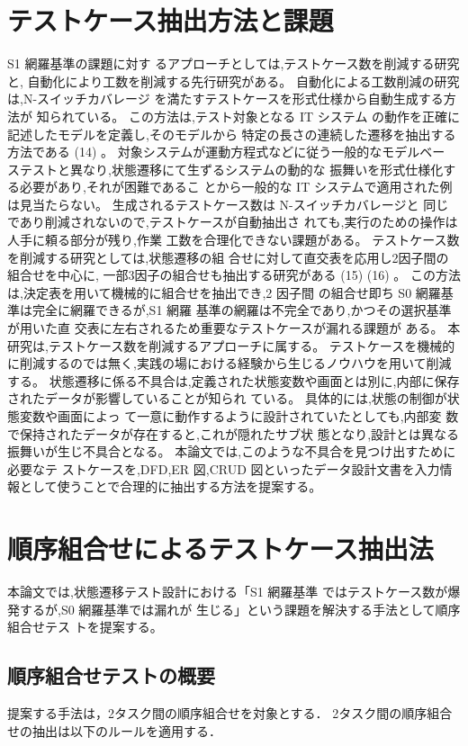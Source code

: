 \documentclass[a4paper,12pt]{jreport}
\begin{document}
\section{テストケース抽出方法と課題}
S1 網羅基準の課題に対す るアプローチとしては,テストケース数を削減する研究と, 自動化により工数を削減する先行研究がある。
自動化による工数削減の研究は,N-スイッチカバレージ を満たすテストケースを形式仕様から自動生成する方法が 知られている。
この方法は,テスト対象となる IT システム の動作を正確に記述したモデルを定義し,そのモデルから 特定の長さの連続した遷移を抽出する方法である (14) 。
対象システムが運動方程式などに従う一般的なモデルベー ステストと異なり,状態遷移にて生ずるシステムの動的な 振舞いを形式仕様化する必要があり,それが困難であるこ とから一般的な IT システムで適用された例は見当たらない。
生成されるテストケース数は N-スイッチカバレージと 同じであり削減されないので,テストケースが自動抽出さ れても,実行のための操作は人手に頼る部分が残り,作業 工数を合理化できない課題がある。
テストケース数を削減する研究としては,状態遷移の組 合せに対して直交表を応用し2因子間の組合せを中心に, 一部3因子の組合せも抽出する研究がある (15) (16) 。
この方法 は,決定表を用いて機械的に組合せを抽出でき,2 因子間 の組合せ即ち S0 網羅基準は完全に網羅できるが,S1 網羅 基準の網羅は不完全であり,かつその選択基準が用いた直 交表に左右されるため重要なテストケースが漏れる課題が ある。
 本研究は,テストケース数を削減するアプローチに属する。
テストケースを機械的に削減するのでは無く,実践の場における経験から生じるノウハウを用いて削減する。
状態遷移に係る不具合は,定義された状態変数や画面とは別に,内部に保存されたデータが影響していることが知られ ている。
具体的には,状態の制御が状態変数や画面によっ て一意に動作するように設計されていたとしても,内部変 数で保持されたデータが存在すると,これが隠れたサブ状 態となり,設計とは異なる振舞いが生じ不具合となる。
本論文では,このような不具合を見つけ出すために必要なテ ストケースを,DFD,ER 図,CRUD 図といったデータ設計文書を入力情報として使うことで合理的に抽出する方法を提案する。

\section{順序組合せによるテストケース抽出法}
本論文では,状態遷移テスト設計における「S1 網羅基準 ではテストケース数が爆発するが,S0 網羅基準では漏れが 生じる」という課題を解決する手法として順序組合せテス トを提案する。

\subsection{順序組合せテストの概要}
提案する手法は，2タスク間の順序組合せを対象とする．
2タスク間の順序組合せの抽出は以下のルールを適用する．
\end{document}
